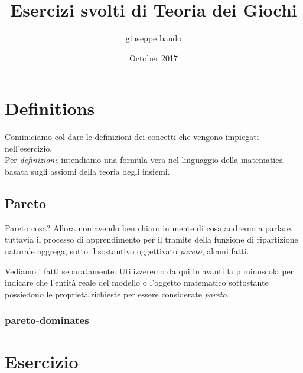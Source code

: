 \documentclass[a4paper,12pt]{book}
\begin{document}
\author{giuseppe baudo}
\title{Esercizi svolti di Teoria dei Giochi}
\date{October 2017}


\frontmatter
\maketitle
\tableofcontents


\chapter{Definitions}
Cominiciamo col dare le definizioni dei concetti che vengono impiegati nell'esercizio. \\
Per \emph{definizione} intendiamo una formula vera nel linguaggio della matematica basata sugli assiomi della teoria degli insiemi. \\

\section{Pareto}
Pareto cosa? Allora non avendo ben chiaro in mente di cosa andremo a parlare, tuttavia il processo di apprendimento per il tramite della funzione di ripartizione naturale aggrega,
sotto il sostantivo oggettivato \emph{pareto}, alcuni fatti.

Vediamo i fatti separatamente. Utilizzeremo da qui in avanti la p minuscola per indicare che l'entit\`a reale del modello o l'oggetto matematico sottostante possiedono le propriet\`a 
richieste per essere considerate \emph{pareto}.

\subsection{pareto-dominates}


\chapter{Esercizio}
\end{document}
